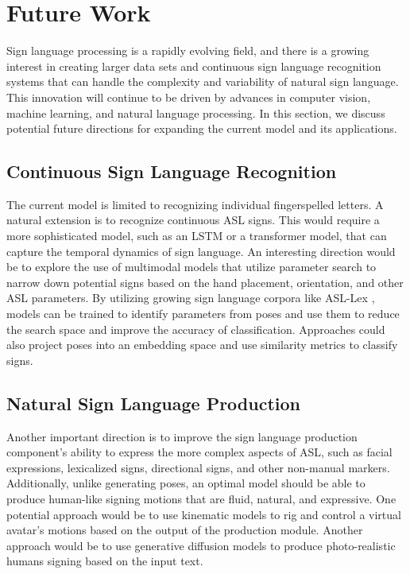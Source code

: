 \documentclass[../paper.tex]{subfiles}
\begin{document}
\section{Future Work}
\label{sec:future_work}

Sign language processing is a rapidly evolving field, and there is a growing interest in creating larger data sets and continuous sign language recognition systems that can handle the complexity and variability of natural sign language. This innovation will continue to be driven by advances in computer vision, machine learning, and natural language processing. In this section, we discuss potential future directions for expanding the current model and its applications.

\subsection*{Continuous Sign Language Recognition}
The current model is limited to recognizing individual fingerspelled letters. A natural extension is to recognize continuous ASL signs. This would require a more sophisticated model, such as an LSTM or a transformer model, that can capture the temporal dynamics of sign language. An interesting direction would be to explore the use of multimodal models that utilize parameter search to narrow down potential signs based on the hand placement, orientation, and other ASL parameters. By utilizing growing sign language corpora like ASL-Lex \cite{asllex}, models can be trained to identify parameters from poses and use them to reduce the search space and improve the accuracy of classification. Approaches could also project poses into an embedding space and use similarity metrics to classify signs. 

\subsection*{Natural Sign Language Production}
Another important direction is to improve the sign language production component's ability to express the more complex aspects of ASL, such as facial expressions, lexicalized signs, directional signs, and other non-manual markers. Additionally, unlike generating poses, an optimal model should be able to produce human-like signing motions that are fluid, natural, and expressive. One potential approach would be to use kinematic models to rig and control a virtual avatar's motions based on the output of the production module. Another approach would be to use generative diffusion models to produce photo-realistic humans signing based on the input text.
\end{document}
